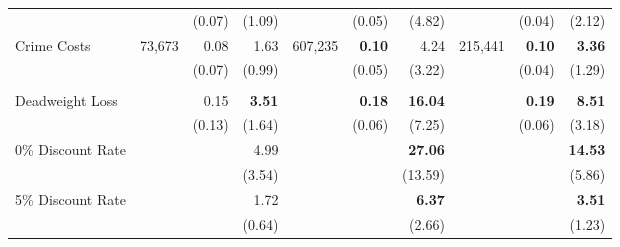 \begin{tabular}{l r r r r r r r r r}
	&	&	(0.07)	&	(1.09)	&	&	(0.05)	&	(4.82)	&	&	(0.04)	&	(2.12)	\\
Crime Costs	&	73,673	&	0.08	&	1.63	&	607,235	&	\textbf{0.10}	&	4.24	& 215,441	&	\textbf{0.10}	&	\textbf{3.36}	\\
	&	&	(0.07)	&	(0.99)	&		&	(0.05)	&	(3.22)	&	&	(0.04)	&	(1.29)	\\ \\
Deadweight Loss	&		&	0.15	&	\textbf{3.51}	&		&	\textbf{0.18}	&	\textbf{16.04}	&		&	\textbf{0.19}	&	\textbf{8.51}	\\
	&		&	(0.13)	&	(1.64)	&		&	(0.06)	&	(7.25)	&		&	(0.06)	&	(3.18)	\\
0\% Discount Rate	&		&		&	4.99	&		&		&	\textbf{27.06}	&		&		&	\textbf{14.53}	\\
	&		&		&	(3.54)	&		&		&	(13.59)	&		&		&	(5.86)	\\
5\% Discount Rate	&		&		&	1.72	&		&		&	\textbf{6.37}	&		&		&	\textbf{3.51}	\\
	&		&		&	(0.64)	&		&		&	(2.66)	&		&		&	(1.23)	\\
\bottomrule																			
\end{tabular}																			
